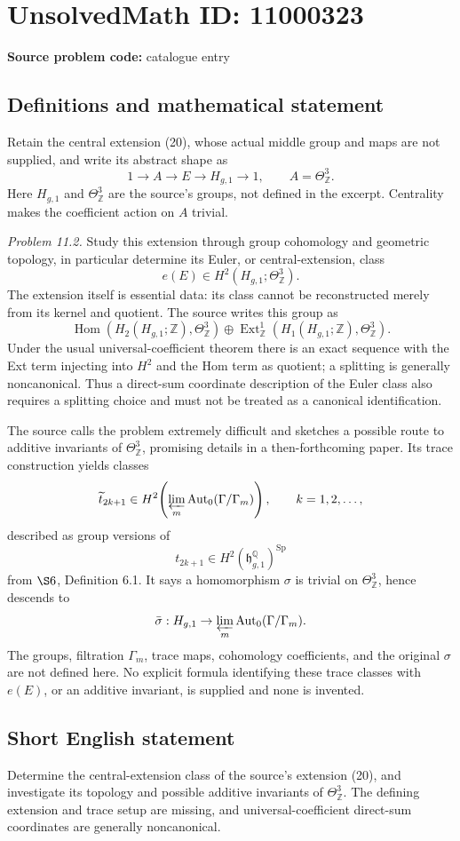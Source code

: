 \documentclass[11pt]{article}
\newcommand{\Z}{\mathbb{Z}}
\newcommand{\Q}{\mathbb{Q}}
\begin{document}
\section*{UnsolvedMath ID: 11000323}
\textbf{Source problem code:} catalogue entry
\subsection{Definitions and mathematical statement}
Retain the central extension (20), whose actual middle group and maps are not supplied, and write its abstract shape as
\[
 1\longrightarrow A\longrightarrow E\longrightarrow H_{g,1}\longrightarrow1,
 \qquad A=\Theta^3_{\Z}.
\]
Here \(H_{g,1}\) and \(\Theta^3_{\Z}\) are the source's groups, not defined in the excerpt. Centrality makes the coefficient action on \(A\) trivial.

\emph{Problem 11.2.} Study this extension through group cohomology and geometric topology, in particular determine its Euler, or central-extension, class
\[
 e(E)\in H^2(H_{g,1};\Theta^3_{\Z}).
\]
The extension itself is essential data: its class cannot be reconstructed merely from its kernel and quotient. The source writes this group as
\[
 \operatorname{Hom}(H_2(H_{g,1};\Z),\Theta^3_{\Z})
 \oplus\operatorname{Ext}_{\Z}^1(H_1(H_{g,1};\Z),\Theta^3_{\Z}).
\]
Under the usual universal-coefficient theorem there is an exact sequence with the Ext term injecting into \(H^2\) and the Hom term as quotient; a splitting is generally noncanonical. Thus a direct-sum coordinate description of the Euler class also requires a splitting choice and must not be treated as a canonical identification.

The source calls the problem extremely difficult and sketches a possible route to additive invariants of \(\Theta^3_{\Z}\), promising details in a then-forthcoming paper. Its trace construction yields classes
\[
 \widetilde t_{2k+1}\in
 H^2\!\left(\varprojlim_m\operatorname{Aut}_0(\Gamma/\Gamma_m)\right),
 \qquad k=1,2,\ldots,
\]
described as group versions of
\[
 t_{2k+1}\in H^2(\mathfrak h_{g,1}^{\Q})^{\operatorname{Sp}}
\]
from \(\S6\), Definition 6.1. It says a homomorphism \(\sigma\) is trivial on \(\Theta^3_{\Z}\), hence descends to
\[
 \bar\sigma:H_{g,1}\to
 \varprojlim_m\operatorname{Aut}_0(\Gamma/\Gamma_m).
\]
The groups, filtration \(\Gamma_m\), trace maps, cohomology coefficients, and the original \(\sigma\) are not defined here. No explicit formula identifying these trace classes with \(e(E)\), or an additive invariant, is supplied and none is invented.
\subsection{Short English statement}
Determine the central-extension class of the source's extension (20), and investigate its topology and possible additive invariants of \(\Theta^3_{\Z}\). The defining extension and trace setup are missing, and universal-coefficient direct-sum coordinates are generally noncanonical.
\end{document}
